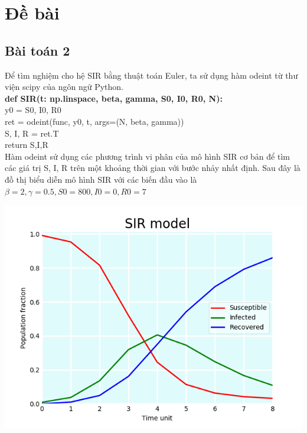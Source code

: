 \documentclass[a4paper]{article}
\begin{document}
\section{Đề bài}\label{bai_tap}
\subsection{Bài toán 2}  
Để tìm nghiệm cho hệ SIR bằng thuật toán Euler, ta sử dụng hàm odeint từ thư viện scipy của ngôn ngữ Python.\\
 \textbf{\quad def  SIR(t: np.linspace, beta, gamma, S0, I0, R0, N): \\}
\null \qquad \qquad y0 = S0, I0, R0 \\ 
\null \qquad \qquad ret = odeint(func, y0, t, args=(N, beta, gamma)) \\ 
\null \qquad \qquad S, I, R = ret.T \\ 
\null \qquad \qquad return S,I,R \\
Hàm odeint sử dụng các phương trình vi phân của mô hình SIR cơ bản để tìm các giá trị S, I, R trên một khoảng thời gian với bước nhảy nhất định.
Sau đây là đồ thị biểu diễn mô hình SIR với các biến đầu vào là $\beta=2, \gamma=0.5, S0=800, I0=0, R0=7$
\begin{center}
\includegraphics[scale=0.8]{Images/Figure_1.png}
\end{center}
\end{document}
